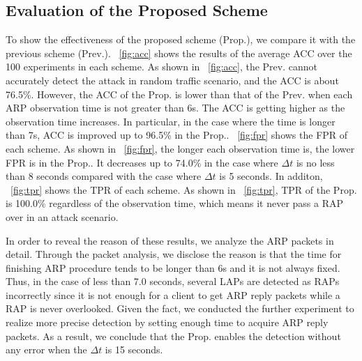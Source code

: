 \documentclass[conference]{IEEEtran}
\begin{document}
\subsection{Evaluation of the Proposed Scheme}
To show the effectiveness of the proposed scheme (Prop.), we compare it with the previous scheme \cite{previous} (Prev.).
\figurename~\ref{fig:acc} shows the results of the average ACC over the 100 experiments in each scheme.
As shown in \figurename~\ref{fig:acc}, the Prev. cannot accurately detect the attack in random traffic scenario, and the ACC is about 76.5\%.
However, the ACC of the Prop. is lower than that of the Prev. when each ARP observation time is not greater than 6s.
The ACC is getting higher as the observation time increases.
In particular, in the case where the time is longer than 7s, ACC is improved up to 96.5\% in the Prop..
\figurename~\ref{fig:fpr} shows the FPR of each scheme.
As shown in \figurename~\ref{fig:fpr}, the longer each observation time is, the lower FPR is in the Prop..
It decreases up to 74.0\% in the case where $\Delta t$ is no less than 8 seconds compared with the case where $\Delta t$ is 5 seconds.
In additon, \figurename~\ref{fig:tpr} shows the TPR of each scheme.
As shown in \figurename~\ref{fig:tpr}, TPR of the Prop. is 100.0\% regardless of the observation time, which means it never pass a RAP over in an attack scenario.

In order to reveal the reason of these results, we analyze the ARP packets in detail.
Through the packet analysis, we disclose the reason is that the time for finishing ARP procedure tends to be longer than 6s and it is not always fixed.
Thus, in the case of less than 7.0 seconds, several LAPs are detected as RAPs incorrectly since it is not enough for a client to get ARP reply packets while a RAP is never overlooked.
Given the fact, we conducted the further experiment to realize more precise detection by setting enough time to acquire ARP reply packets.
As a result, we conclude that the Prop. enables the detection without any error when the $\Delta t$ is 15 seconds.
\end{document}
